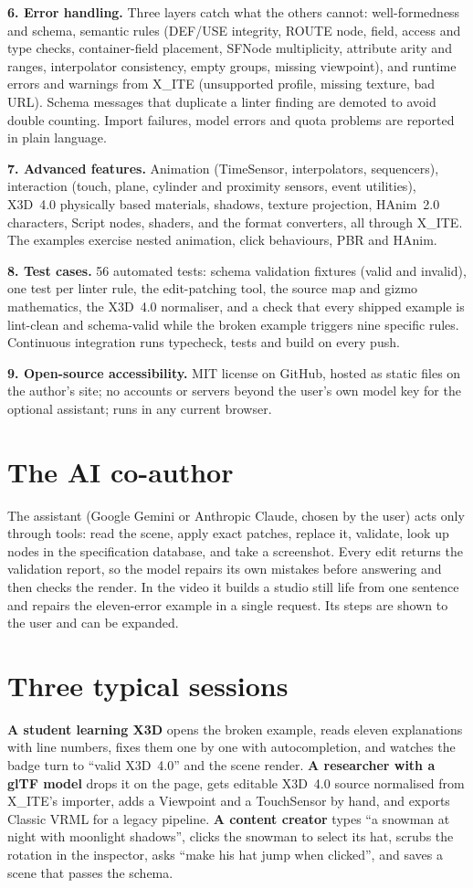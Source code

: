 \documentclass[10pt,a4paper,twocolumn]{article}
\begin{document}
\textbf{6. Error handling.} Three layers catch what the others cannot: well-formedness and schema, semantic rules (DEF/USE integrity, ROUTE node, field, access and type checks, container-field placement, SFNode multiplicity, attribute arity and ranges, interpolator consistency, empty groups, missing viewpoint), and runtime errors and warnings from X\_ITE (unsupported profile, missing texture, bad URL). Schema messages that duplicate a linter finding are demoted to avoid double counting. Import failures, model errors and quota problems are reported in plain language.

\textbf{7. Advanced features.} Animation (TimeSensor, interpolators, sequencers), interaction (touch, plane, cylinder and proximity sensors, event utilities), X3D~4.0 physically based materials, shadows, texture projection, HAnim~2.0 characters, Script nodes, shaders, and the format converters, all through X\_ITE. The examples exercise nested animation, click behaviours, PBR and HAnim.

\textbf{8. Test cases.} 56 automated tests: schema validation fixtures (valid and invalid), one test per linter rule, the edit-patching tool, the source map and gizmo mathematics, the X3D~4.0 normaliser, and a check that every shipped example is lint-clean and schema-valid while the broken example triggers nine specific rules. Continuous integration runs typecheck, tests and build on every push.

\textbf{9. Open-source accessibility.} MIT license on GitHub, hosted as static files on the author's site; no accounts or servers beyond the user's own model key for the optional assistant; runs in any current browser.

\section{The AI co-author}
The assistant (Google Gemini or Anthropic Claude, chosen by the user) acts only through tools: read the scene, apply exact patches, replace it, validate, look up nodes in the specification database, and take a screenshot. Every edit returns the validation report, so the model repairs its own mistakes before answering and then checks the render. In the video it builds a studio still life from one sentence and repairs the eleven-error example in a single request. Its steps are shown to the user and can be expanded.

\section{Three typical sessions}
\textbf{A student learning X3D} opens the broken example, reads eleven explanations with line numbers, fixes them one by one with autocompletion, and watches the badge turn to ``valid X3D~4.0'' and the scene render. \textbf{A researcher with a glTF model} drops it on the page, gets editable X3D~4.0 source normalised from X\_ITE's importer, adds a Viewpoint and a TouchSensor by hand, and exports Classic VRML for a legacy pipeline. \textbf{A content creator} types ``a snowman at night with moonlight shadows'', clicks the snowman to select its hat, scrubs the rotation in the inspector, asks ``make his hat jump when clicked'', and saves a scene that passes the schema.
\end{document}
